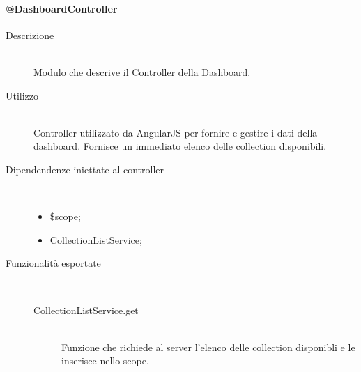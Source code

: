 \paragraph{@DashboardController}
\begin{description}
 \item[Descrizione] \hfill \\
 Modulo che descrive il Controller della Dashboard.
 
 \item[Utilizzo] \hfill \\
 Controller utilizzato da AngularJS per fornire e gestire i dati della dashboard.
Fornisce un immediato elenco delle collection disponibili.
 
 \item[Dipendendenze iniettate al controller] \hfill \\
 \begin{itemize}
  \item \$scope;
  \item CollectionListService;
  
 \end{itemize}
 
 \item[Funzionalità esportate] \hfill \\
 \begin{description}
  \item[CollectionListService.get] \hfill \\
  Funzione che richiede al server l'elenco delle collection disponibli e le inserisce nello scope.
  
 \end{description}
\end{description}

